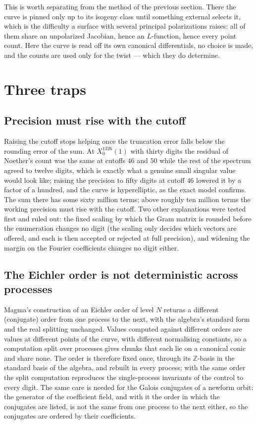 \documentclass[11pt,reqno]{amsart}
\theoremstyle{plain}
\theoremstyle{definition}
\newcommand{\Z}{\mathbb{Z}}
\begin{document}
This is worth separating from the method of the previous section. There the curve is pinned only up
to its isogeny class until something external selects it, which is the difficulty a surface with
several principal polarizations raises: all of them share an unpolarized Jacobian, hence an
$L$-function, hence every point count. Here the curve is read off its own canonical differentials,
no choice is made, and the counts are used only for the twist --- which they do determine.

\section{Three traps}

\subsection*{Precision must rise with the cutoff}
Raising the cutoff stops helping once the truncation error falls below the rounding error of the
sum. At $X_0^{1326}(1)$ with thirty digits the residual of Noether's count was the same at cutoffs
$46$ and $50$ while the rest of the spectrum agreed to twelve digits, which is exactly what a
genuine small singular value would look like; raising the precision to fifty digits at cutoff
$46$ lowered it by a factor of a hundred, and the curve is hyperelliptic, as the exact model
confirms. The sum there has some sixty million terms; above roughly ten million terms the
working precision must rise with the cutoff. Two other explanations were tested first and ruled
out: the fixed scaling by which the Gram matrix is rounded before the enumeration changes no digit
(the scaling only decides which vectors are offered, and each is then accepted or rejected at full
precision), and widening the margin on the Fourier coefficients changes no digit either.

\subsection*{The Eichler order is not deterministic across processes}
Magma's construction of an Eichler order of level $N$ returns a different (conjugate) order from
one process to the next, with the algebra's standard form and the real splitting unchanged. Values
computed against different orders are values at different points of the curve, with different
normalising constants, so a computation split over processes gives chunks that each lie on a
canonical conic and share none. The order is therefore fixed once, through its $\Z$-basis in the
standard basis of the algebra, and rebuilt in every process; with the same order the split
computation reproduces the single-process invariants of the control to every digit. The same
care is needed for the Galois conjugates of a newform orbit: the generator of the coefficient
field, and with it the order in which the conjugates are listed, is not the same from one process
to the next either, so the conjugates are ordered by their coefficients.
\end{document}
